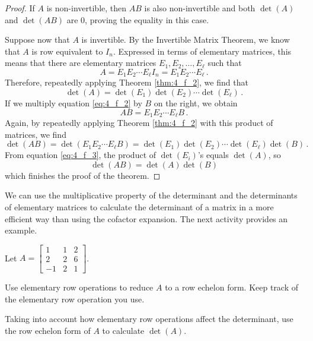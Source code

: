 \begin{proof}
If $A$ is non-invertible, then $AB$ is also non-invertible and both $\det(A)$ and $\det(AB)$ are 0, proving the equality in this case.

Suppose now that $A$ is invertible. By the Invertible Matrix Theorem, we know that $A$ is row equivalent to $I_n$. Expressed in terms of elementary matrices, this means that there are elementary matrices $E_1, E_2, \ldots, E_\ell$ such that 
\begin{equation} \label{eq:4_f_2}  
A= E_1 E_2 \cdots E_\ell I_n = E_1 E_2 \cdots E_\ell \,. 
\end{equation}
Therefore, repeatedly applying Theorem \ref{thm:4_f_2}, we find that 
\begin{equation} \label{eq:4_f_3}  
\det(A) = \det(E_1) \det(E_2) \cdots \det(E_\ell) \, .
\end{equation}
If we multiply equation \eqref{eq:4_f_2} by $B$ on the right, we obtain
\[ AB = E_1 E_2 \cdots E_\ell B \,. \]
Again, by repeatedly applying Theorem \ref{thm:4_f_2} with this product of matrices, we find
\[ \det(AB) = \det(E_1 E_2 \cdots E_\ell B ) = \det(E_1) \det(E_2) \cdots \det(E_\ell) \det(B) \, .\]
From equation \eqref{eq:4_f_3}, the product of $\det(E_i)$'s equals $\det(A)$, so 
\[ \det(AB) = \det(A) \det(B) \]
which finishes the proof of the theorem.
\end{proof}



We can use the multiplicative property of the determinant and the determinants of elementary matrices to calculate the determinant of a matrix in a more efficient way than using the cofactor expansion. The next activity provides an example.



\begin{activity} \label{act:4_f_2} Let $A=\left[ \begin{array}{rcc} 1&1&2\\ 2&2&6\\ -1&2&1\end{array} \right]$.
\ba 
\item Use elementary row operations to reduce $A$ to a row echelon form. Keep track of the elementary row operation you use.


\item Taking into account how elementary row operations affect the determinant, use the row echelon form of $A$ to calculate $\det(A)$.


\ea 
\end{activity}



